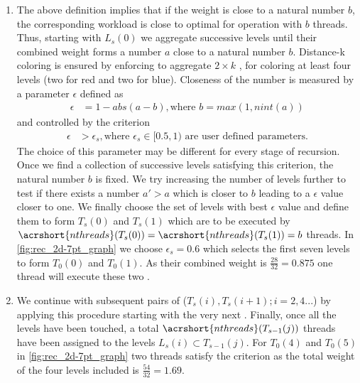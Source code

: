 \begin{enumerate}
	\item The above definition implies that if the weight is close to a natural number $b$, the corresponding workload is close to optimal for operation with $b$ threads. Thus, starting with $L_s(0)$ we aggregate successive levels until their combined weight forms a number $a$ close to a natural number $b$. Distance-k coloring is ensured by enforcing to aggregate \atleast $2 \times k$ \levels, \ie for \DTWO coloring at least four levels (two for red and two for blue). Closeness of the number is measured by a parameter $\epsilon$ defined as
	\begin{align*}
		\epsilon &=  1 - abs(a-b), \text{where } b= max(1,nint(a))
	\end{align*}
	and controlled by the criterion
	\begin{align*}
	\epsilon &> \epsilon_s, \text{where $\epsilon_s \in  [0.5,1)$ are user defined parameters.} 	
	\end{align*}		   
	The choice of this parameter may be different for every stage of recursion. 
	 Once we find a collection of successive levels satisfying this criterion, the natural number $b$ is fixed. We try increasing the number of levels further to test if there exists a number $a'>a$ which is closer to $b$ leading to a $\epsilon$ value closer to one. We finally choose the set of levels with best $\epsilon$ value and define them to form $T_s(0)$ and $T_s(1)$ which are to be executed by $\acrshort{nthreads}(T_s(0))=\acrshort{nthreads}(T_s(1))=b$ threads.	 
	 In \cref{fig:rec_2d-7pt_graph} we choose $\epsilon_s = 0.6$ which selects the first seven levels to form $T_0(0)$ and $T_0(1)$.  As their combined weight is $\frac{28}{32}=0.875$  one thread will execute these two \levelGroups. 

	\item We continue with subsequent pairs of \levelGroups ($T_s(i), T_s(i+1); i=2,4 ...$) by applying this procedure starting with the very next \level. Finally, once all the levels have been touched, a total $\acrshort{nthreads}(T_{s-1}(j))$ threads have been assigned to the levels $L_s(i) \subset T_{s-1}(j)$. For $T_0(4)$ and $T_0(5)$  in \cref{fig:rec_2d-7pt_graph} two threads satisfy the criterion as the total weight of the four levels included is $\frac{54}{32}=1.69$.
	

\end{enumerate}
